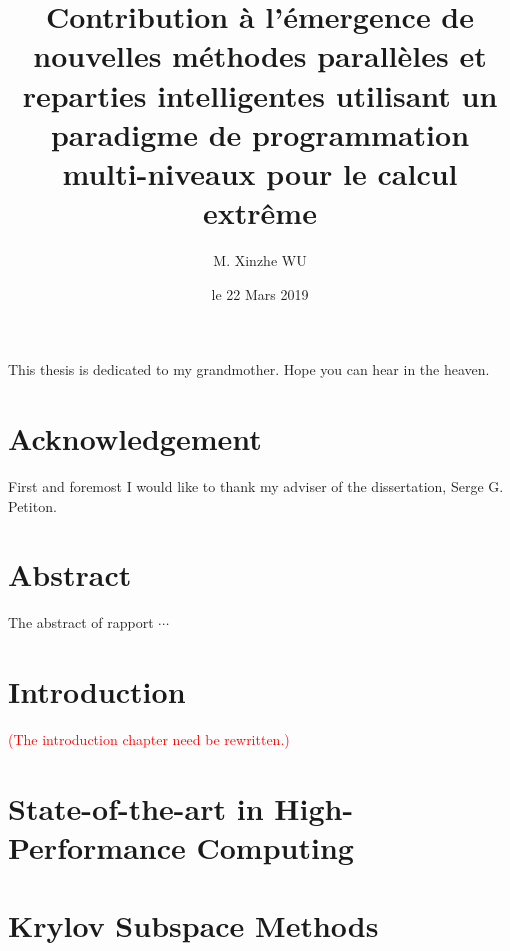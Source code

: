 \documentclass{xinzhewu}
\title{\large \textrm{Contribution \`a l’\'emergence de nouvelles m\'ethodes parall\`eles et reparties intelligentes utilisant un paradigme de programmation multi-niveaux pour le calcul extr\^eme}}
\author{M. Xinzhe WU}
\date{le 22 Mars 2019}
\newenvironment{dedication}
{\clearpage           %
	\thispagestyle{empty}%
	\vspace*{\stretch{1}}%
	\itshape             %
	\raggedleft          %
}
{\par %
	\vspace{\stretch{3}} %
	\clearpage           %
}
\begin{document}
\maketitle

\clearemptydoublepage
\begin{dedication}
	This thesis is dedicated to my grandmother. Hope you can hear in the heaven.
\end{dedication}

\clearemptydoublepage

\chapter*{Acknowledgement}
\thispagestyle{empty}
First and foremost I would like to thank my adviser of the dissertation, Serge G. Petiton.

\clearemptydoublepage
\chapter*{Abstract}
\thispagestyle{empty}
The abstract of rapport $\cdots$

\clearemptydoublepage


\clearemptydoublepage

\frontmatter

{\small \tableofcontents}

{\small
\listoffigures
{}
}

{\small
\listoftables
{}
}

\mainmatter %

\chapter{Introduction}

\textcolor{red}{(The introduction chapter need be rewritten.)}



\chapter{State-of-the-art in High-Performance Computing}



\chapter{Krylov Subspace Methods}
\end{document}
